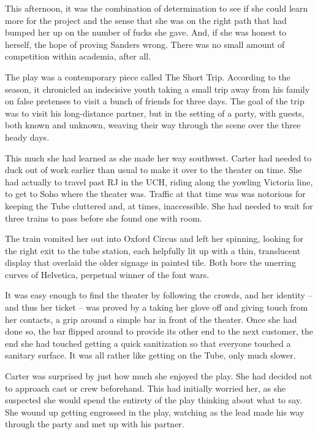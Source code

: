 This afternoon, it was the combination of determination to see if she could learn more for the project and the sense that she was on the right path that had bumped her up on the number of fucks she gave.  And, if she was honest to herself, the hope of proving Sanders wrong.  There was no small amount of competition within academia, after all.

\secdiv

The play was a contemporary piece called The Short Trip.  According to the season, it chronicled an indecisive youth taking a small trip away from his family on false pretenses to visit a bunch of friends for three days.  The goal of the trip was to visit his long-distance partner, but in the setting of a party, with guests, both known and unknown, weaving their way through the scene over the three heady days.

This much she had learned as she made her way southwest.  Carter had needed to duck out of work earlier than usual to make it over to the theater on time.  She had actually to travel past RJ in the UCH, riding along the yowling Victoria line, to get to Soho where the theater was.  Traffic at that time was was notorious for keeping the Tube cluttered and, at times, inaccessible.  She had needed to wait for three trains to pass before she found one with room.

The train vomited her out into Oxford Circus and left her spinning, looking for the right exit to the tube station, each helpfully lit up with a thin, translucent display that overlaid the older signage in painted tile.  Both bore the unerring curves of Helvetica, perpetual winner of the font wars.

It was easy enough to find the theater by following the crowds, and her identity -- and thus her ticket -- was proved by a taking her glove off and giving touch from her contacts, a grip around a simple bar in front of the theater.  Once she had done so, the bar flipped around to provide its other end to the next customer, the end she had touched getting a quick sanitization so that everyone touched a sanitary surface.  It was all rather like getting on the Tube, only much slower.

Carter was surprised by just how much she enjoyed the play.  She had decided not to approach cast or crew beforehand.  This had initially worried her, as she suspected she would spend the entirety of the play thinking about what to say.  She wound up getting engrossed in the play, watching as the lead made his way through the party and met up with his partner.

